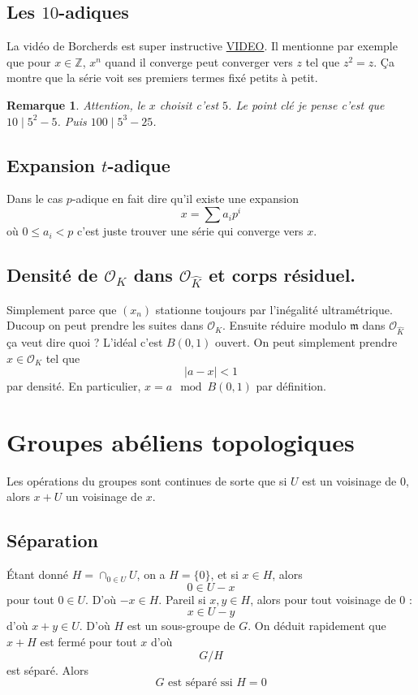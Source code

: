 \documentclass[a4paper,12pt]{book}
\newcommand{\Z}{\mathbb{Z}}
\newcommand{\Or}{\mathcal{O}}
\newcommand{\m}{\mathfrak m}
\theoremstyle{plain}
\newtheorem{rem}{Remarque}
\theoremstyle{definition}
\theoremstyle{remark}
\begin{document}
\section{Les $10$-adiques}
La vidéo de Borcherds est super instructive 
\href{https://www.youtube.com/watch?v=VTtBDSWR1Ac}{VIDEO}.
Il mentionne
par exemple que pour $x\in \Z$, $x^n$ quand il converge
peut converger vers $z$ tel que $z^2=z$. Ça montre que la 
série voit ses premiers termes fixé petits à petit.
\begin{rem}
    Attention, le $x$ choisit c'est $5$. Le point clé je
    pense c'est que $10 \mid 5^2-5$. Puis $100\mid 5^3-25$.
\end{rem}

\section{Expansion $t$-adique}

Dans le cas $p$-adique en fait dire qu'il existe une
expansion \[x=\sum a_i p^i\]
où $0\leq a_i<p$ c'est juste trouver une série qui converge
vers $x$. 

\section{Densité de $\Or_K$ dans $\Or_{\hat K}$ et corps résiduel.}
Simplement parce que $(x_n)$ stationne toujours par
l'inégalité ultramétrique. Ducoup on peut prendre les suites
dans $\Or_K$. Ensuite réduire modulo $\m$ dans $\Or_{\hat K}$
ça veut dire quoi ? L'idéal c'est $B(0,1)$ ouvert. On peut
simplement prendre $x\in \Or_K$ tel que 
\[|a-x|<1\]
par densité. En particulier, $x=a\mod B(0,1)$ par définition.


\chapter{Groupes abéliens topologiques}
Les opérations du groupes sont continues de sorte que si
$U$ est un voisinage de $0$, alors $x+U$ un voisinage de $x$.
\section{Séparation}
Étant donné $H=\cap_{0\in U} U$, on a $H=\{0\}$, et si $x\in H$,
alors 
\[0\in U-x\]
pour tout $0\in U$. D'où $-x\in H$. Pareil si $x,y\in H$, alors
pour tout voisinage de $0$ :
\[x\in U-y\]
d'où $x+y\in U$. D'où $H$ est un sous-groupe de $G$.
On déduit rapidement que $x+H$ est fermé pour tout $x$ d'où
\[G/H\]
est séparé. Alors 
\[G\textrm{ est séparé ssi }H=0\]
\end{document}
